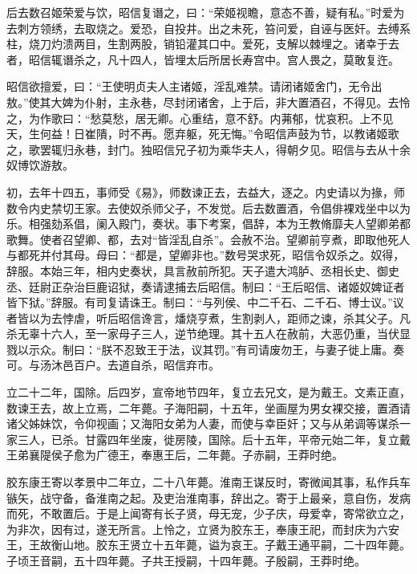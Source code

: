 \documentclass[12pt,UTF8]{ctexbook}
\begin{document}
后去数召姬荣爱与饮，昭信复谮之，曰：“荣姬视瞻，意态不善，疑有私。”时爱为去刺方领绣，去取烧之。爱恐，自投井。出之未死，笞问爱，自诬与医奸。去缚系柱，烧刀灼溃两目，生割两股，销铅灌其口中。爱死，支解以棘埋之。诸幸于去者，昭信辄谮杀之，凡十四人，皆埋太后所居长寿宫中。宫人畏之，莫敢复迕。



昭信欲擅爱，曰：“王使明贞夫人主诸姬，淫乱难禁。请闭诸姬舍门，无令出敖。”使其大婢为仆射，主永巷，尽封闭诸舍，上于后，非大置酒召，不得见。去怜之，为作歌曰：“愁莫愁，居无卿。心重结，意不舒。内茀郁，忧哀积。上不见天，生何益！日崔隤，时不再。愿弃躯，死无悔。”令昭信声鼓为节，以教诸姬歌之，歌罢辄归永巷，封门。独昭信兄子初为乘华夫人，得朝夕见。昭信与去从十余奴博饮游敖。



初，去年十四五，事师受《易》，师数谏正去，去益大，逐之。内史请以为掾，师数令内史禁切王家。去使奴杀师父子，不发觉。后去数置酒，令倡俳裸戏坐中以为乐。相强劾系倡，阑入殿门，奏状。事下考案，倡辞，本为王教脩靡夫人望卿弟都歌舞。使者召望卿、都，去对“皆淫乱自杀”。会赦不治。望卿前亨煮，即取他死人与都死并付其母。母曰：“都是，望卿非也。”数号哭求死，昭信令奴杀之。奴得，辞服。本始三年，相内史奏状，具言赦前所犯。天子遣大鸿胪、丞相长史、御史丞、廷尉正杂治巨鹿诏狱，奏请逮捕去后昭信。制曰：“王后昭信、诸姬奴婢证者皆下狱。”辞服。有司复请诛王。制曰：“与列侯、中二千石、二千石、博士议。”议者皆以为去悖虐，听后昭信谗言，燔烧亨煮，生割剥人，距师之谏，杀其父子。凡杀无辜十六人，至一家母子三人，逆节绝理。其十五人在赦前，大恶仍重，当伏显戮以示众。制曰：“朕不忍致王于法，议其罚。”有司请废勿王，与妻子徙上庸。奏可。与汤沐邑百户。去道自杀，昭信弃市。



立二十二年，国除。后四岁，宣帝地节四年，复立去兄文，是为戴王。文素正直，数谏王去，故上立焉，二年薨。子海阳嗣，十五年，坐画屋为男女裸交接，置酒请诸父姊妹饮，令仰视画；又海阳女弟为人妻，而使与幸臣奸；又与从弟调等谋杀一家三人，已杀。甘露四年坐废，徙房陵，国除。后十五年，平帝元始二年，复立戴王弟襄隄侯子愈为广德王，奉惠王后，二年薨。子赤嗣，王莽时绝。



胶东康王寄以孝景中二年立，二十八年薨。淮南王谋反时，寄微闻其事，私作兵车镞矢，战守备，备淮南之起。及吏治淮南事，辞出之。寄于上最亲，意自伤，发病而死，不敢置后。于是上闻寄有长子贤，母无宠，少子庆，母爱幸，寄常欲立之，为非次，因有过，遂无所言。上怜之，立贤为胶东王，奉康王祀，而封庆为六安王，王故衡山地。胶东王贤立十五年薨，谥为哀王。子戴王通平嗣，二十四年薨。子顷王音嗣，五十四年薨。子共王授嗣，十四年薨。子殷嗣，王莽时绝。
\end{document}

